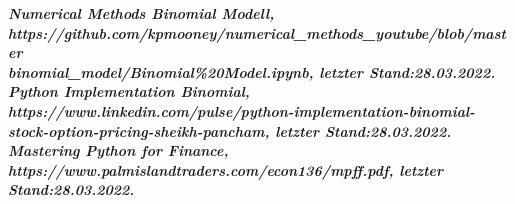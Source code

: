 \documentclass[12pt,a4paper]{article}
\begin{document}
\begin{text}
 \bfseries\itshape\underline{}{Numerical Methods Binomial Modell},\mdseries\\
{https://github.com/kpmooney/numerical\_methods\_youtube/blob/master\\\/binomial\_model/Binomial\%20Model.ipynb, letzter Stand:28.03.2022}. \\

 \bfseries\itshape\underline{}{Python Implementation Binomial},\mdseries\\
{https://www.linkedin.com/pulse/python-implementation-binomial-stock-option-pricing-sheikh-pancham, letzter Stand:28.03.2022}. \\

 \bfseries\itshape\underline{}{Mastering Python for Finance},\mdseries \\
{https://www.palmislandtraders.com/econ136/mpff.pdf, letzter Stand:28.03.2022}.\\

\end{text}
\end{document}
